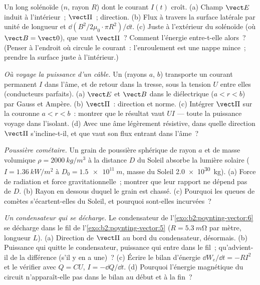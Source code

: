 \begin{exercise}[$\star\star$]\label{exo:b2:poynting-vector:7}
Un long solénoïde ($n$, rayon $R$) dont le courant $I(t)$ croît. (a)
Champ $\vect E$ induit à l'intérieur~; $\vect\Pi$~; direction. (b) Flux à travers la
surface latérale par unité de longueur et $\dd(B^2/2\mu_0\cdot\pi R^2)/\dd t$. (c)
Juste à l'extérieur du solénoïde (où $\vect B = \vect 0$), que vaut $\vect\Pi$~?
Comment l'énergie entre-t-elle alors~? (Penser à l'endroit où circule le courant~:
l'enroulement est une nappe mince~; prendre la surface juste à l'intérieur.)
\end{exercise}

\begin{exercise}[$\star\star$]\label{exo:b2:poynting-vector:8}
\emph{Où voyage la puissance d'un câble.} Un  (rayons $a$,
$b$) transporte un courant permanent $I$ dans l'âme, et de retour dans la tresse, sous
la tension $U$ entre elles (conducteurs parfaits). (a) $\vect E$ et $\vect B$
dans le diélectrique ($a < r < b$) par Gauss et Ampère. (b) $\vect\Pi$~:
direction et norme. (c) Intégrer $\vect\Pi$ sur la couronne $a < r
< b$~: montrer que le résultat vaut $UI$ --- toute la puissance voyage dans
l'isolant. (d) Avec une âme légèrement résistive, dans quelle direction
$\vect\Pi$ s'incline-t-il, et que vaut son flux entrant dans l'âme~?
\end{exercise}

\begin{exercise}[$\star\star$]\label{exo:b2:poynting-vector:9}
\emph{Poussière cométaire.} Un grain de poussière sphérique de rayon $a$ et de masse volumique
$\rho = \qty{2000}{kg/m^3}$ à la distance $D$ du Soleil absorbe la
lumière solaire ($I = \qty{1.36}{kW/m^2}$ à $D_0 = \qty{1.5e11}{m}$, masse du Soleil
\qty{2.0e30}{kg}). (a) Force de radiation et force gravitationnelle~; montrer que
leur rapport ne dépend pas de $D$. (b) Rayon en dessous duquel le grain est
chassé. (c) Pourquoi les queues de comètes s'écartent-elles du Soleil, et pourquoi
sont-elles incurvées~?
\end{exercise}

\begin{exercise}[$\star\star\star$]\label{exo:b2:poynting-vector:10}
\emph{Un condensateur qui se décharge.} Le condensateur de
l'\cref{exo:b2:poynting-vector:6} se décharge dans le fil de
l'\cref{exo:b2:poynting-vector:5} ($R = \qty{5.3}{m\ohm}$ par mètre, longueur
$L$). (a) Direction de $\vect\Pi$ au bord du condensateur, désormais. (b) Puissance
qui quitte le condensateur, puissance qui entre dans le fil~; qu'advient-il de la
différence (s'il y en a une)~? (c) Écrire le bilan d'énergie $\dd W_e/\dd t = -RI^2$
et le vérifier avec $Q = CU$, $I = -\dd Q/\dd t$. (d) Pourquoi l'énergie
magnétique du circuit n'apparaît-elle pas dans le bilan au
début et à la fin~?
\end{exercise}

